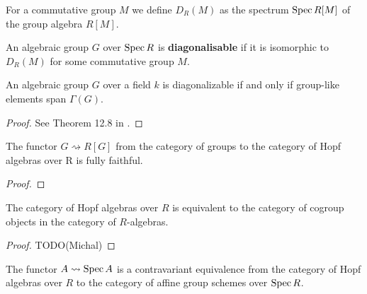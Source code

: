 \begin{definition}
  \label{0-spec-grp-alg}
  \leanok

  For a commutative group $M$ we define $D_R(M)$ as the spectrum $\operatorname{Spec} R[M]$ of the group algebra $R[M]$.
\end{definition}


\begin{definition}
  \label{0-diag}

  An algebraic group $G$ over $\operatorname{Spec} R$ is {\bf diagonalisable}
  if it is isomorphic to $D_R(M)$ for some commutative group $M$.
\end{definition}

\begin{theorem}
  \label{0-diag-iff-grp-like-span}
  An algebraic group $G$ over a field $k$ is diagonalizable
  if and only if group-like elements span $\Gamma(G)$.
\end{theorem}
\begin{proof}
  See Theorem 12.8 in \cite{Milne_2017}.
\end{proof}

\begin{proposition}
  \label{0-full-grp-hopf}
  \uses{}

  The functor $G \rightsquigarrow R[G]$
  from the category of groups
  to the category of Hopf algebras over R
  is fully faithful.
\end{proposition}
\begin{proof}

\end{proof}

\begin{proposition}
  \label{0-hopf-cogrp}
  \uses{}
  \leanok

  The category of Hopf algebras over $R$ is equivalent to the category of cogroup objects in the category of $R$-algebras.
\end{proposition}
\begin{proof}
  \uses{}

  TODO(Michal)
\end{proof}


\begin{theorem}
  \label{0-congr_hopf_affgrpsch}

  The functor $A\rightsquigarrow \operatorname{Spec} A$ is a contravariant equivalence
  from the category of Hopf algebras over $R$
  to the category of affine group schemes over $\operatorname{Spec} R$.
\end{theorem}

